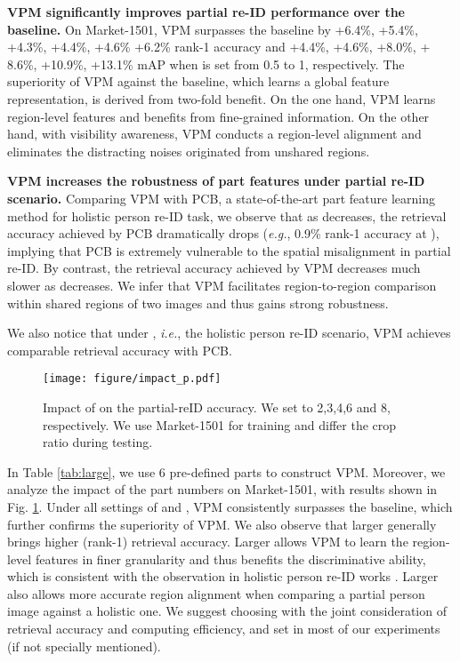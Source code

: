 \documentclass[10pt,twocolumn,letterpaper]{article}
\begin{document}
\textbf{VPM significantly improves partial re-ID performance over the baseline.} On Market-1501, VPM surpasses the baseline by +6.4\%, +5.4\%, +4.3\%, +4.4\%, +4.6\% +6.2\% rank-1 accuracy and +4.4\%, +4.6\%, +8.0\%, + 8.6\%, +10.9\%, +13.1\% mAP when  is set from 0.5 to 1, respectively. 
The superiority of VPM against  the baseline, which learns a global feature representation, is derived from two-fold benefit. On the one hand, VPM learns region-level features and benefits from fine-grained information. On the other hand, with visibility awareness, VPM conducts a region-level alignment and eliminates the distracting noises originated from  unshared regions. 

\textbf{VPM increases the robustness of part features under partial re-ID scenario.} Comparing VPM with PCB, a state-of-the-art part feature learning method for holistic person re-ID task, we observe that as  decreases, the retrieval accuracy achieved by PCB dramatically drops (\emph{e.g.}, 0.9\% rank-1 accuracy at  ), implying that PCB is extremely vulnerable to the spatial misalignment in partial re-ID.  By contrast, the retrieval accuracy achieved by VPM decreases much slower as  decreases. We infer that VPM facilitates region-to-region comparison within shared regions of two images and thus gains strong robustness.

We also notice that under , \emph{i.e.}, the holistic person re-ID scenario, VPM achieves comparable retrieval accuracy with PCB.  


\begin{figure}[t]
\setlength{\abovecaptionskip}{-1.2cm} 
\setlength{\belowcaptionskip}{-0.4cm}
\begin{center}
\texttt{[image: figure/impact\_p.pdf]}
\end{center}
   \caption{Impact of  on the partial-reID accuracy. We set  to 2,3,4,6 and 8, respectively. We use Market-1501 for training and differ the crop ratio  during testing.}
\label{fig:numbers}
\end{figure}
In Table \ref{tab:large}, we use 6 pre-defined parts to construct VPM. Moreover, we analyze the impact of the part numbers  on Market-1501, with results shown in Fig. \ref{fig:numbers}. Under all settings of  and , VPM consistently surpasses the baseline, which further confirms the superiority of VPM. We also observe that larger  generally brings higher (rank-1) retrieval accuracy. Larger  allows VPM to learn the region-level features in finer granularity and thus benefits the discriminative ability, which is consistent with the observation in holistic person re-ID works \cite{Zhao2017Deeply, PCB_ECCV}. Larger  also allows more accurate region alignment when comparing a partial person image against a holistic one. We suggest choosing  with the joint consideration of retrieval accuracy and computing efficiency, and set  in most of our experiments (if not specially mentioned). 
\end{document}

